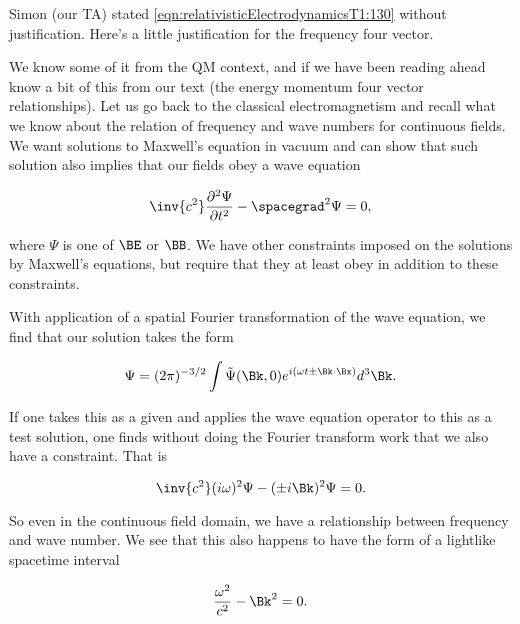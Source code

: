 %
%

Simon (our TA) stated \cref{eqn:relativisticElectrodynamicsT1:130} without justification.  Here's a little justification for the frequency four vector.

We know some of it from the QM context, and if we have been reading ahead know a bit of this from our text \citep{landau1980classical} (the energy momentum four vector relationships).  Let us go back to the classical electromagnetism and recall what we know about the relation of frequency and wave numbers for continuous fields.  We want solutions to Maxwell's equation in vacuum and can show that such solution also implies that our fields obey a wave equation

\begin{equation}\label{eqn:relativisticElectrodynamicsT1:131}
\inv{c^2} \frac{\partial^2 \Psi}{\partial t^2} - \spacegrad^2 \Psi = 0,
\end{equation}

where $\Psi$ is one of $\BE$ or $\BB$.  We have other constraints imposed on the solutions by Maxwell's equations, but require that they at least obey  in addition to these constraints.

With application of a spatial Fourier transformation of the wave equation, we find that our solution takes the form

\begin{equation}\label{eqn:relativisticElectrodynamicsT1:132}
\Psi = (2 \pi)^{-3/2} \int \tilde{\Psi}(\Bk, 0) e^{i (\omega t \pm \Bk \cdot \Bx) } d^3 \Bk.
\end{equation}

If one takes this as a given and applies the wave equation operator to this as a test solution, one finds without doing the Fourier transform work that we also have a constraint.  That is

\begin{equation}\label{eqn:relativisticElectrodynamicsT1:133}
\inv{c^2} (i \omega)^2 \Psi - (\pm i \Bk)^2 \Psi = 0.
\end{equation}

So even in the continuous field domain, we have a relationship between frequency and wave number.  We see that this also happens to have the form of a lightlike spacetime interval

\begin{equation}\label{eqn:relativisticElectrodynamicsT1:134}
\frac{\omega^2}{c^2} - \Bk^2 = 0.
\end{equation}

